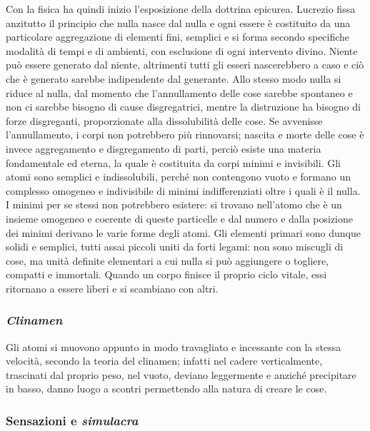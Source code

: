 \documentclass[10pt,a4paper]{article}
\begin{document}
	Con la fisica ha quindi inizio l'esposizione della dottrina epicurea. Lucrezio fissa anzitutto il principio che nulla nasce dal nulla e ogni essere è costituito da una particolare aggregazione di elementi fini, semplici e si forma secondo specifiche modalità di tempi e di ambienti, con esclusione di ogni intervento divino. Niente può essere generato dal niente, altrimenti tutti gli esseri nascerebbero a caso e ciò che è generato sarebbe indipendente dal generante. Allo stesso modo nulla si riduce al nulla, dal momento che l'annullamento delle cose sarebbe spontaneo e non ci sarebbe bisogno di cause disgregatrici, mentre la distruzione ha bisogno di forze disgreganti, proporzionate alla dissolubilità delle cose. Se avvenisse l'annullamento, i corpi non potrebbero più rinnovarsi; nascita e morte delle cose è invece aggregamento e disgregamento di parti, perciò esiste una materia fondamentale ed eterna, la quale è costituita da corpi minimi e invisibili. Gli atomi sono semplici e indissolubili, perché non contengono vuoto e formano un complesso omogeneo e indivisibile di minimi indifferenziati oltre i quali è il nulla. I minimi per se stessi non potrebbero esistere: si trovano nell'atomo che è un insieme omogeneo e coerente di queste particelle e dal numero e dalla posizione dei minimi derivano le varie forme degli atomi. Gli elementi primari sono dunque solidi e semplici, tutti assai piccoli uniti da forti legami: non sono miscugli di cose, ma unità definite elementari a cui nulla si può aggiungere o togliere, compatti e immortali. Quando un corpo finisce il proprio ciclo vitale, essi ritornano a essere liberi e si scambiano con altri.
	
	\subsubsection{\textit{Clinamen}}
	
	Gli atomi si muovono appunto in modo travagliato e incessante con la stessa velocità, secondo la teoria del clinamen; infatti nel cadere verticalmente, trascinati dal proprio peso, nel vuoto, deviano leggermente e anziché precipitare in basso, danno luogo a scontri permettendo alla natura di creare le cose. 
	
	\subsubsection{Sensazioni e \textit{simulacra}}
	
\end{document}
